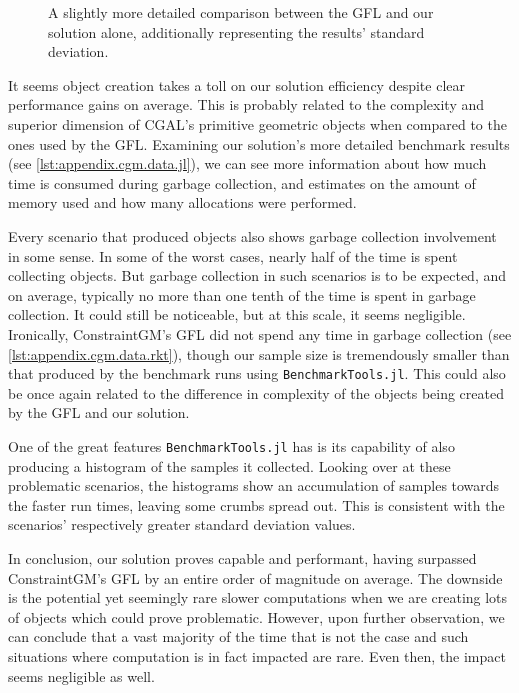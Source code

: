 \begin{figure}[htb]
  \centering
  \caption[ConstraintGM's GFL vs. Our solution]{\label{fig:eval.cgm.perferr}%
    A slightly more detailed comparison between the \ac{GFL} and our solution
    alone, additionally representing the results' standard deviation.}
\end{figure}

It seems object creation takes a toll on our solution efficiency despite clear
performance gains on average.  This is probably related to the complexity and
superior dimension of \ac{CGAL}'s primitive geometric objects when compared to
the ones used by the \ac{GFL}.  Examining our solution's more detailed benchmark
results (see \cref{lst:appendix.cgm.data.jl}), we can see more information about
how much time is consumed during garbage collection, and estimates on the amount
of memory used and how many allocations were performed.

Every scenario that produced objects also shows garbage collection involvement
in some sense.  In some of the worst cases, nearly half of the time is spent
collecting objects.  But garbage collection in such scenarios is to be expected,
and on average, typically no more than one tenth of the time is spent in garbage
collection.  It could still be noticeable, but at this scale, it seems
negligible.  Ironically, ConstraintGM's \ac{GFL} did not spend any time in
garbage collection (see \cref{lst:appendix.cgm.data.rkt}), though our sample size
is tremendously smaller than that produced by the benchmark runs using
\texttt{BenchmarkTools.jl}.  This could also be once again related to the
difference in complexity of the objects being created by the \ac{GFL} and our
solution.

One of the great features \texttt{BenchmarkTools.jl} has is its capability of
also producing a histogram of the samples it collected.  Looking over at these
problematic scenarios, the histograms show an accumulation of samples towards
the faster run times, leaving some crumbs spread out.  This is consistent with
the scenarios' respectively greater standard deviation values.

In conclusion, our solution proves capable and performant, having surpassed
ConstraintGM's \ac{GFL} by an entire order of magnitude on average.  The
downside is the potential yet seemingly rare slower computations when we are
creating lots of objects which could prove problematic.  However, upon further
observation, we can conclude that a vast majority of the time that is not the
case and such situations where computation is in fact impacted are rare.  Even
then, the impact seems negligible as well.
